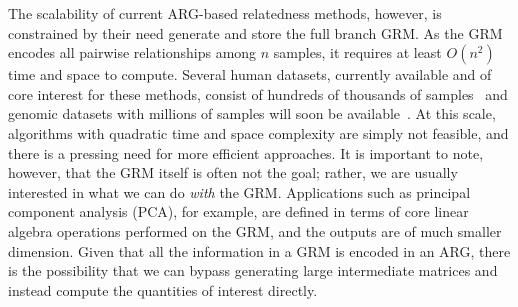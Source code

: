 
The scalability of current ARG-based relatedness methods, however, is constrained by
their need generate and store the full branch GRM. As the GRM encodes all 
pairwise relationships among $n$ samples, it requires at least $O(n^2)$
time and space to compute. 
Several human datasets, currently available and of core interest for these 
methods, consist of hundreds of thousands of 
samples~\citep{caulfield2017national,turnbull2018100,
bycroft2018genome,backman2021exome,halldorsson2022sequences,uk2023whole,
all2024genomic}
and genomic datasets with millions of samples will soon be 
available~\citep{stark2024call,cook2025our}.
At this scale, algorithms with quadratic time and space complexity are simply
not feasible, and there is a pressing need for more efficient approaches.
It is important to note, however, that the GRM itself is often not the goal;
rather, we are usually interested in what we can do \emph{with} the GRM.
Applications such as principal component analysis (PCA), for example, are
defined in terms of core linear algebra operations performed on the GRM,
and the outputs are of much smaller dimension. Given that all the information
in a GRM is encoded in an ARG, there is the possibility that we can bypass
generating large intermediate matrices and instead compute the quantities
of interest directly.



